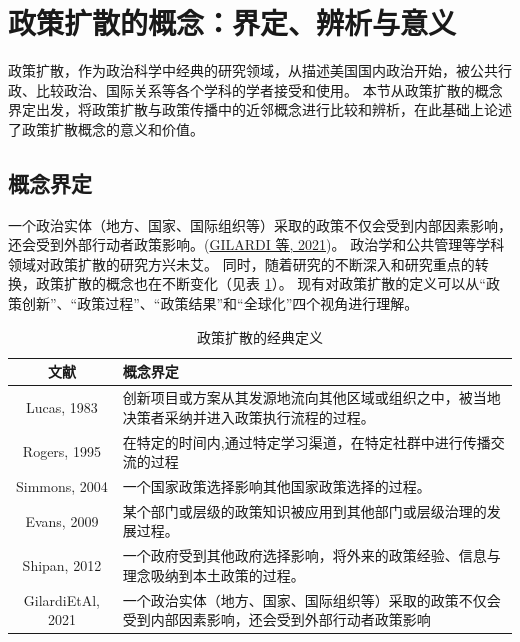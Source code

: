 \documentclass[
  12pt,
]{ctexart}
\begin{document}
\newpage

\hypertarget{ux653fux7b56ux6269ux6563ux7684ux6982ux5ff5ux754cux5b9aux8fa8ux6790ux4e0eux610fux4e49}{%
\section{政策扩散的概念：界定、辨析与意义}\label{ux653fux7b56ux6269ux6563ux7684ux6982ux5ff5ux754cux5b9aux8fa8ux6790ux4e0eux610fux4e49}}

政策扩散，作为政治科学中经典的研究领域，从描述美国国内政治开始，被公共行政、比较政治、国际关系等各个学科的学者接受和使用。
本节从政策扩散的概念界定出发，将政策扩散与政策传播中的近邻概念进行比较和辨析，在此基础上论述了政策扩散概念的意义和价值。

\hypertarget{ux6982ux5ff5ux754cux5b9a}{%
\subsection{概念界定}\label{ux6982ux5ff5ux754cux5b9a}}

一个政治实体（地方、国家、国际组织等）采取的政策不仅会受到内部因素影响，还会受到外部行动者政策影响。(\protect\hyperlink{ref-GilardiEtAl2021}{GILARDI 等, 2021})。
政治学和公共管理等学科领域对政策扩散的研究方兴未艾。
同时，随着研究的不断深入和研究重点的转换，政策扩散的概念也在不断变化（见表 \ref{tab:definition}）。
现有对政策扩散的定义可以从``政策创新''、``政策过程''、``政策结果''和``全球化''四个视角进行理解。

\begin{table}[!h]

\caption{\label{tab:definition}政策扩散的经典定义}
\centering
\begin{tabular}[t]{c>{\centering\arraybackslash}p{30em}}
\toprule
文献 & 概念界定\\
\midrule
Lucas, 1983 & 创新项目或方案从其发源地流向其他区域或组织之中，被当地决策者采纳并进入政策执行流程的过程。\\
Rogers, 1995 & 在特定的时间内,通过特定学习渠道，在特定社群中进行传播交流的过程\\
Simmons, 2004 & 一个国家政策选择影响其他国家政策选择的过程。\\
Evans, 2009 & 某个部门或层级的政策知识被应用到其他部门或层级治理的发展过程。\\
Shipan, 2012 & 一个政府受到其他政府选择影响，将外来的政策经验、信息与理念吸纳到本土政策的过程。\\
\addlinespace
GilardiEtAl, 2021 & 一个政治实体（地方、国家、国际组织等）采取的政策不仅会受到内部因素影响，还会受到外部行动者政策影响\\
\bottomrule
\end{tabular}
\end{table}
\end{document}

